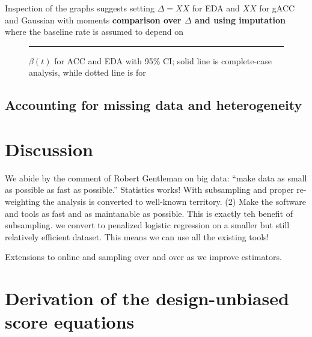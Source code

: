 \documentclass[12pt]{amsart}
\begin{document}
Inspection of the graphs suggests setting $\Delta = XX$ for EDA and $XX$ for gACC and  Gaussian with moments {\bf comparison over $\Delta$ and using imputation} where the baseline rate is assumed to depend on

\begin{figure}[!th]
\rule{3cm}{3cm}%
\caption{$\beta (t)$ for ACC and EDA with 95\% CI; solid line is complete-case analysis, while dotted line is for }
\label{}
\end{figure}

\subsection{Accounting for missing data and heterogeneity}



\section{Discussion}
We abide by the comment of Robert Gentleman on big data: ``make data as small as possible as fast as possible.'' Statistics works!  With subsampling and proper re-weighting the analysis is converted to well-known territory. (2) Make the software and tools as fast and as maintanable as possible.  This is exactly teh benefit of subsampling.  we convert to penalized logistic regression on a smaller but still relatively efficient dataset. This means we can use all the existing tools!

Extensions to online and sampling over and over as we improve estimators.




\newpage
\appendix

\section{Derivation of the design-unbiased score equations}
\end{document}
